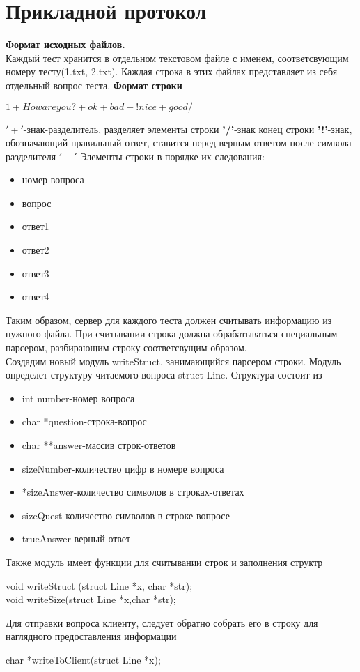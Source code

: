 \documentclass[12pt,a4paper]{report}
\begin{document}
\section{Прикладной протокол}
\label{protocol_tcp}
\textbf{Формат исходных файлов.}\\
Каждый тест хранится в отдельном текстовом файле с именем, соответсвующим номеру тесту(1.txt, 2.txt).
Каждая строка в этих файлах представляет из себя отдельный вопрос теста. \newline
\textbf{Формат строки}\newline 
\begin{center}
$1\mp How are you?\mp ok \mp bad \mp !nice \mp good/$
\end{center}
\textbf{$'\mp'$}-знак-разделитель, разделяет элементы строки\newline
\textbf{'/'}-знак конец строки\newline
\textbf{'!'}-знак, обозначающий правильный ответ, ставится перед верным ответом после символа-разделителя \textbf{$'\mp'$} \newline
Элементы строки в порядке их следования:
\begin{itemize}
\item{номер вопроса}
\item{вопрос}
\item{ответ1}
\item{ответ2}
\item{ответ3} 
\item{ответ4}
\end{itemize}
Таким образом, сервер для каждого теста должен считывать информацию из нужного файла. При считывании строка должна обрабатываться специальным парсером, разбирающим строку соответсвущим образом.\\
Создадим новый модуль writeStruct, занимающийся парсером строки. Модуль определет структуру читаемого вопроса struct Line. Структура состоит из
\begin{itemize}
\item{int number-номер вопроса}
\item{char *question-строка-вопрос}
\item{char **answer-массив строк-ответов}
\item{sizeNumber-количество цифр в номере вопроса}
\item{*sizeAnswer-количество символов в строках-ответах} 
\item{sizeQuest-количество символов в строке-вопросе}
\item{trueAnswer-верный ответ}
\end{itemize}
Также модуль имеет функции для считывании строк и заполнения структр\\
\begin{center}
void writeStruct (struct Line *x, char *str);\\
void writeSize(struct Line *x,char *str);\\
\end{center}
Для отправки вопроса клиенту, следует обратно собрать его в строку для наглядного предоставления информации\\
\begin{center} 
char *writeToClient(struct Line *x);\\
\end{center}
\end{document}
